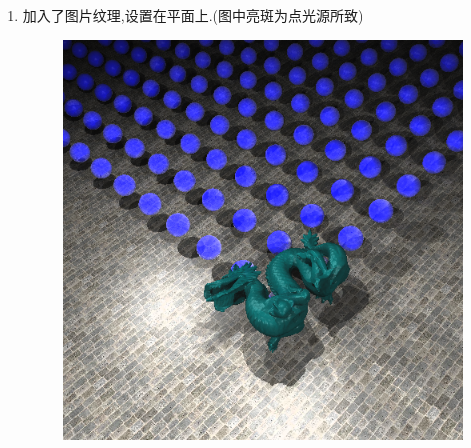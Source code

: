 \begin{enumerate}
  \item 加入了图片纹理,设置在平面上.(图中亮斑为点光源所致)
    \begin{figure}[H]
      \centering
      \includegraphics[scale=0.4]{img/pic_texture.png}
      \caption*{\label{fig:texture}}
    \end{figure}


\end{enumerate}
